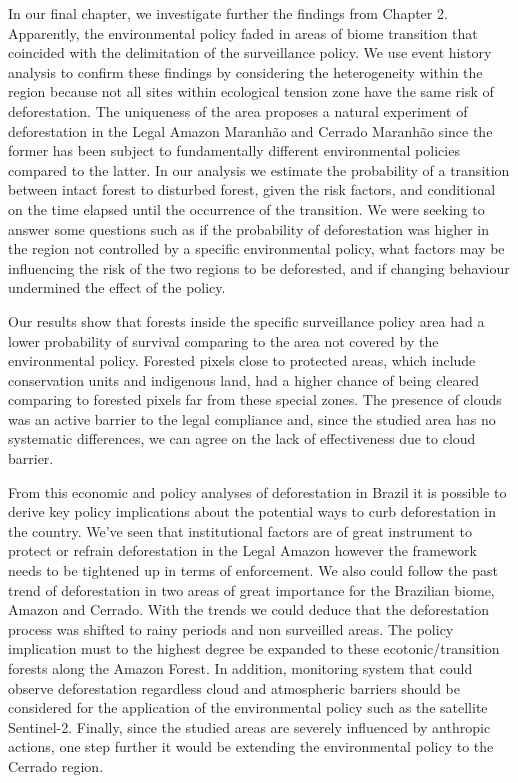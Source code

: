 
In our final chapter, we investigate further the findings from  Chapter 2. Apparently, the environmental policy faded in areas of biome transition that coincided with the delimitation of the surveillance policy. We use event history analysis to confirm these findings by considering the heterogeneity within the region because not all sites within ecological tension zone have the same risk of deforestation. The uniqueness of the area proposes a natural experiment of deforestation in the Legal Amazon Maranhão and Cerrado Maranhão since the former has been subject to fundamentally different environmental policies compared to the latter. In our analysis we estimate the probability of a transition between intact forest to disturbed forest, given the risk factors, and conditional on the time elapsed until the occurrence of the transition. We were seeking to answer some questions such as if the probability of deforestation was higher in the region not controlled by a specific environmental policy, what factors may be influencing the risk of the two regions to be deforested, and if changing behaviour undermined the effect of the policy.

Our results show that forests inside the specific surveillance policy area had a lower probability of survival comparing to the area not covered by the environmental policy. Forested pixels close to protected areas,  which include conservation units and indigenous land, had a higher chance of being cleared comparing to forested pixels far from these special zones. The presence of clouds was an active barrier to the legal compliance and, since the studied area has no systematic differences, we can agree on the lack of effectiveness due to cloud barrier.

From this economic and policy analyses of deforestation in Brazil it is possible to derive key policy implications about the potential ways to curb deforestation in the country. We've seen that institutional factors are of great instrument to protect or refrain deforestation in the Legal Amazon however the framework needs to be tightened up in terms of enforcement. We also could follow the past trend of deforestation in two areas of great importance for the Brazilian biome, Amazon and Cerrado. With the trends we could deduce that the deforestation process was shifted to rainy periods and non surveilled areas. The policy implication must to the highest degree be expanded to these ecotonic/transition forests along the Amazon Forest. In addition, monitoring system that could observe deforestation regardless cloud and atmospheric barriers should be considered for the application of the environmental policy such as the satellite Sentinel-2. Finally, since the studied areas are severely influenced by anthropic actions, one step further it would be extending the environmental policy to the Cerrado region. 